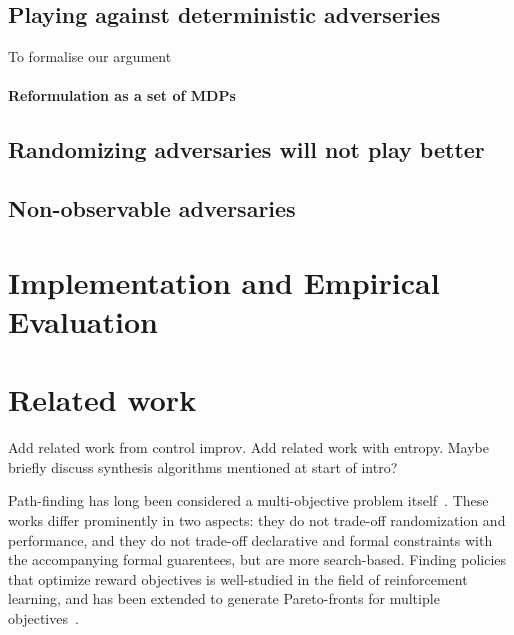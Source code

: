 \documentclass[conference]{IEEEtran}
\theoremstyle{remark}
\newcommand{\sg}{\mathcal{G}}
\newcommand{\eventually}[1]{\lozenge^{\leq #1}}
\newcommand{\sched}{\sigma}
\begin{document}
\subsection{Playing against deterministic adverseries}
To formalise our argument
\paragraph{Reformulation as a set of MDPs}

\paragraph{}


\subsection{Randomizing adversaries will not play better}

\subsection{Non-observable adversaries}
%


\section{Implementation and Empirical Evaluation}

\section{Related work}
\color{red}
\cite{DBLP:journals/corr/abs-2009-10883}
\cite{DBLP:journals/jcss/BrazdilCFK17}

Add related work from control improv.
Add related work with entropy.
Maybe briefly discuss synthesis algorithms mentioned at start of intro?
\color{black}



Path-finding has long been considered a multi-objective problem itself~\cite{DBLP:conf/icra/AmigoniG05,DBLP:journals/eswa/NazarahariKD19,DBLP:conf/icml/XuTMRSM20}.
These works differ prominently in two aspects: they do not trade-off randomization and performance, and they do not trade-off declarative and formal constraints with the accompanying formal guarentees, but are more search-based. 
Finding policies that optimize reward objectives is well-studied in the field of reinforcement learning, and has been extended to generate Pareto-fronts for multiple objectives~\cite{DBLP:conf/icml/NatarajanT05,DBLP:conf/adprl/ParisiPSBR14}.
\end{document}
